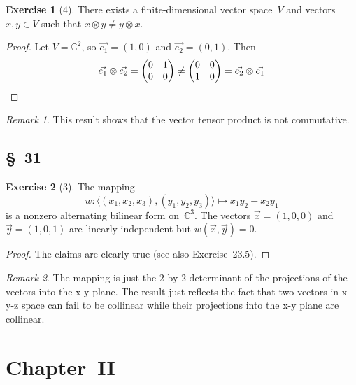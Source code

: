 \documentclass[letterpaper,12pt]{article}
\newcommand{\C}{\mathbb{C}}
\newcommand{\tprod}{\otimes}
\newcommand{\pair}[2]{\langle{#1},{#2}\rangle}
\theoremstyle{definition}
\newtheorem*{exer}{Exercise}
\theoremstyle{remark}
\newtheorem*{rmk}{Remark}
\theoremstyle{direction}
\begin{document}
\begin{exer}[4]
There exists a finite-dimensional vector space~\(V\) and vectors \(x,y\in V\) such that \(x\tprod y\ne y\tprod x\).
\end{exer}
\begin{proof}
Let \(V=\C^2\), so \(\vec{e_1}=(1,0)\) and \(\vec{e_2}=(0,1)\). Then
\[\vec{e_1}\tprod\vec{e_2}=
	\begin{pmatrix}
		0&1\\
		0&0
	\end{pmatrix}\neq
	\begin{pmatrix}
		0&0\\
		1&0
	\end{pmatrix}
=\vec{e_2}\tprod\vec{e_1}\qedhere\]
\end{proof}
\begin{rmk}
This result shows that the vector tensor product is not commutative.
\end{rmk}

\subsection*{\S~31}
\begin{exer}[3]
The mapping
\[w:\pair{(x_1,x_2,x_3)}{(y_1,y_2,y_3)}\mapsto x_1y_2-x_2y_1\]
is a nonzero alternating bilinear form on~\(\C^3\). The vectors \(\vec{x}=(1,0,0)\) and \(\vec{y}=(1,0,1)\) are linearly independent but \(w(\vec{x},\vec{y})=0\).
\end{exer}
\begin{proof}
The claims are clearly true (see also Exercise~23.5).
\end{proof}
\begin{rmk}
The mapping is just the 2-by-2 determinant of the projections of the vectors into the x-y plane. The result just reflects the fact that two vectors in x-y-z space can fail to be collinear while their projections into the x-y plane are collinear.
\end{rmk}

\section*{Chapter~II}
\end{document}
